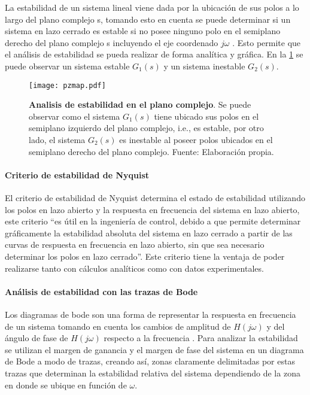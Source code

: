                La estabilidad de un sistema lineal viene dada por la ubicación de sus polos a lo largo del plano complejo s, tomando esto en cuenta se puede determinar si un sistema en lazo cerrado es estable si no posee ninguno polo en el semiplano derecho del plano complejo s incluyendo el eje coordenado $j\omega$ \Parencite{ogata2003ingenieria}. Esto permite que el análisis de estabilidad se pueda realizar de forma analítica y gráfica. En la \cref{fig:pzmap} se puede observar un sistema estable $G_1(s)$ y un sistema inestable $G_2(s)$.

                \begin{figure}[htb]
                    \centering
                    \texttt{[image: pzmap.pdf]}
                    \caption[Ejemplo de analisis de estabilidad en el plano complejo]{\textbf{Analisis de estabilidad en el plano complejo}. Se puede observar como el sistema $G_1(s)$ tiene ubicado sus polos en el semiplano izquierdo del plano complejo, i.e., es estable, por otro lado, el sistema $G_2(s)$ es inestable al poseer polos ubicados en el semiplano derecho del plano complejo. Fuente: Elaboración propia.} 
                    \label{fig:pzmap}
                \end{figure}
            
            \paragraph{Criterio de estabilidad de Nyquist}
                
                El criterio de estabilidad de Nyquist determina el estado de estabilidad utilizando los polos en lazo abierto y la respuesta en frecuencia del sistema en lazo abierto, este criterio \enquote{es útil en la ingeniería de control, debido a que permite determinar gráficamente la estabilidad absoluta del sistema en lazo cerrado a partir de las curvas de respuesta en frecuencia en lazo abierto, sin que sea necesario determinar los polos en lazo cerrado}\Parencite[p.$\,$446]{ogata2003ingenieria}. Este criterio tiene la ventaja de poder realizarse tanto con cálculos analíticos como con datos experimentales.
            
            \paragraph{Análisis de estabilidad con las trazas de Bode}

                Los diagramas de bode son una forma de representar la respuesta en frecuencia de un sistema tomando en cuenta los cambios de amplitud de $H(j\omega)$ y del ángulo de fase de $H(j\omega)$ respecto a la frecuencia \Parencite{nilsson1995circuitos}. Para analizar la estabilidad se utilizan el margen de ganancia y el margen de fase del sistema en un diagrama de Bode a modo de trazas, creando así, zonas claramente delimitadas por estas trazas que determinan la estabilidad relativa del sistema dependiendo de la zona en donde se ubique en función de $\omega$.